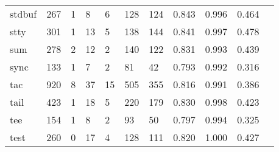 \begin{longtable}{lp{1.10cm}p{1.10cm}p{1.10cm}p{1.10cm}p{1.10cm}p{1.10cm}p{1.10cm}p{1.10cm}p{1.10cm}p{1.10cm}}
stdbuf    &                    267 &                                  1 &                                 8 &                                6 &                               128 &                             124 &                             0.843 &                                 0.996 &                               0.464 \\
stty      &                    301 &                                  1 &                                13 &                                5 &                               138 &                             144 &                             0.841 &                                 0.997 &                               0.478 \\
sum       &                    278 &                                  2 &                                12 &                                2 &                               140 &                             122 &                             0.831 &                                 0.993 &                               0.439 \\
sync      &                    133 &                                  1 &                                 7 &                                2 &                                81 &                              42 &                             0.793 &                                 0.992 &                               0.316 \\
tac       &                    920 &                                  8 &                                37 &                               15 &                               505 &                             355 &                             0.816 &                                 0.991 &                               0.386 \\
tail      &                    423 &                                  1 &                                18 &                                5 &                               220 &                             179 &                             0.830 &                                 0.998 &                               0.423 \\
tee       &                    154 &                                  1 &                                 8 &                                2 &                                93 &                              50 &                             0.797 &                                 0.994 &                               0.325 \\
test      &                    260 &                                  0 &                                17 &                                4 &                               128 &                             111 &                             0.820 &                                 1.000 &                               0.427 \\

\end{longtable}
